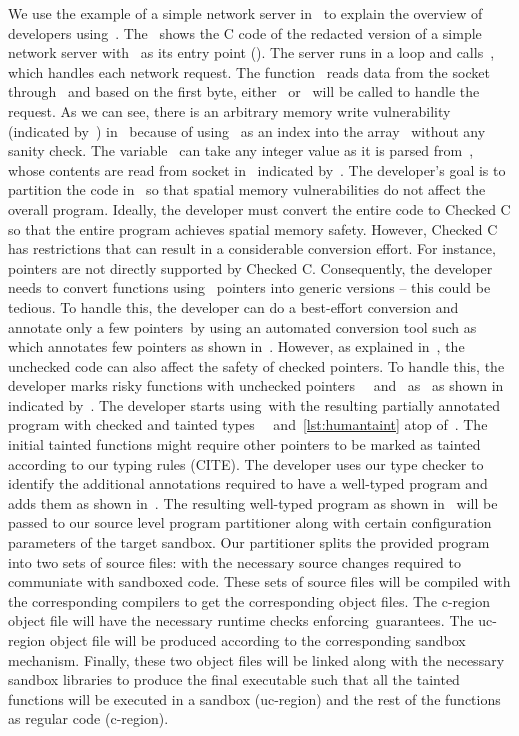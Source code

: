 We use the example of a simple network server in~ to explain the overview of developers using~\systemname{}.
The~ shows the C code of the redacted version of a simple network server with~ as its entry point (\entrypoint).
The server runs in a loop and calls~, which handles each network request.
The function~ reads data from the socket through~ and based on the first byte, either~ or~ will be called to handle the request.
As we can see, there is an arbitrary memory write vulnerability (indicated by~\realbug) in~ because of using~ as an index into the array~ without any sanity check.
The variable~ can take any integer value as it is parsed from~, whose contents are read from socket in~ indicated by~\rootcause. 
The developer's goal is to partition the code in~ so that spatial memory vulnerabilities do not affect the overall program.
Ideally, the developer must convert the entire code to Checked C so that the entire program achieves spatial memory safety.
However, Checked C has restrictions that can result in a considerable conversion effort.
For instance,~ pointers are not directly supported by Checked C.
Consequently, the developer needs to convert functions using~ pointers into generic versions -- this could be tedious.
To handle this, the developer can do a best-effort conversion and annotate only a few pointers~\eg by using an automated conversion tool such as~\threec{} which annotates few pointers as shown in~.
However, as explained in~\sect{}, the unchecked code can also affect the safety of checked pointers.
To handle this, the developer marks risky functions with unchecked pointers~\ie~ and~ as~ as shown in~ indicated by~\useradded.
The developer starts using~\oursystem with the resulting partially annotated program with checked and tainted types~\ie~ and~\ref{lst:humantaint} atop of~.
The initial tainted functions might require other pointers to be marked as tainted according to our typing rules (CITE).
The developer uses our type checker to identify the additional annotations required to have a well-typed program and adds them as shown in~\lst{}.
The resulting well-typed program as shown in~\lst{} will be passed to our source level program partitioner along with certain configuration parameters of the target sandbox.
Our partitioner splits the provided program into two sets of source files:
with the necessary source changes required to communiate with sandboxed code.
These sets of source files will be compiled with the corresponding compilers to get the corresponding object files.
The c-region object file will have the necessary runtime checks enforcing~\systemname guarantees.
The uc-region object file will be produced according to the corresponding sandbox mechanism.
Finally, these two object files will be linked along with the necessary sandbox libraries to produce the final executable such that all the tainted functions will be executed in a sandbox (uc-region) and the rest of the functions as regular code (c-region).


